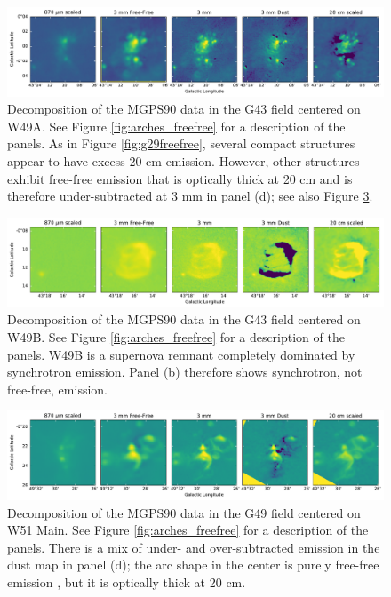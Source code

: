 \documentclass[twocolumn]{aastex62}
\begin{document}
\begin{figure}[htp]
    \includegraphics[width=17cm]{figures/G43_w49a_5panel.pdf}
    \caption{Decomposition of the MGPS90 data in the G43 field centered on W49A.
    See Figure \ref{fig:arches_freefree} for a description of the panels.
    As in Figure \ref{fig:g29freefree}, several compact structures appear to have
    excess 20 cm emission.  However, other structures exhibit free-free
    emission that is optically thick at 20 cm and is therefore under-subtracted
    at 3 mm in panel (d); see also Figure \ref{fig:w51mainfreefree}.
}
\label{fig:w49afreefree}
\end{figure}

\begin{figure}[htp]
    \includegraphics[width=17cm]{figures/G43_w49b_5panel.pdf}
    \caption{Decomposition of the MGPS90 data in the G43 field centered on W49B.
    See Figure \ref{fig:arches_freefree} for a description of the panels.
    W49B is a supernova remnant completely dominated by synchrotron emission.
    Panel (b) therefore shows synchrotron, not free-free, emission.
}
\label{fig:w49bfreefree}
\end{figure}

\begin{figure}[htp]
    \includegraphics[width=17cm]{figures/G49_w51main_5panel.pdf}
    \caption{Decomposition of the MGPS90 data in the G49 field centered on W51 Main.
    See Figure \ref{fig:arches_freefree} for a description of the panels.
    There is a mix of under- and over-subtracted emission in the dust map in panel (d);
    the arc shape in the center is purely free-free emission \citep{Ginsburg2016a,Ginsburg2017a}, but
    it is optically thick at 20 cm.
}
\label{fig:w51mainfreefree}
\end{figure}





\end{document}
